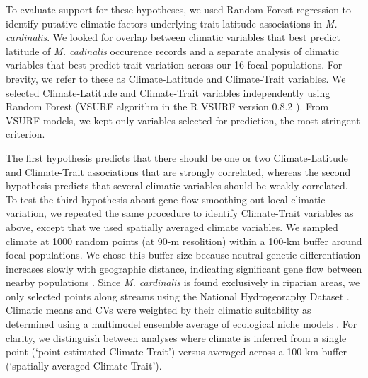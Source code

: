 \documentclass[11pt, oneside]{article}
\newcommand{\pkg}[1]{{\fontseries{b}\selectfont #1}}
\begin{document}
To evaluate support for these hypotheses, we used Random Forest regression \citep{Liaw_Wiener_2002} to identify putative climatic factors underlying trait-latitude associations in \textit{M. cardinalis}. We looked for overlap between climatic variables that best predict latitude of \textit{M. cadinalis} occurence records and a separate analysis of climatic variables that best predict trait variation across our 16 focal populations. For brevity, we refer to these as Climate-Latitude and Climate-Trait variables. We selected Climate-Latitude and Climate-Trait variables independently using Random Forest (VSURF algorithm in the R \pkg{VSURF} version 0.8.2 \citep{Genuer_etal_2014}). From VSURF models, we kept only variables selected for prediction, the most stringent criterion.

The first hypothesis predicts that there should be one or two Climate-Latitude and Climate-Trait associations that are strongly correlated, whereas the second hypothesis predicts that several climatic variables should be weakly correlated. To test the third hypothesis about gene flow smoothing out local climatic variation, we repeated the same procedure to identify Climate-Trait variables as above, except that we used spatially averaged climate variables. We sampled climate at 1000 random points (at 90-m resolition) within a 100-km buffer around focal populations. We chose this buffer size because neutral genetic differentiation increases slowly with geographic distance, indicating significant gene flow between nearby populations \citep{Paul_etal_2016}. Since \textit{M. cardinalis} is found exclusively in riparian areas, we only selected points along streams using the National Hydrogeoraphy Dataset \citep{NHD}. Climatic means and CVs were weighted by their climatic suitability as determined using a multimodel ensemble average of ecological niche models \citep{Angert_ENM}. For clarity, we distinguish between analyses where climate is inferred from a single point (`point estimated Climate-Trait') versus averaged across a 100-km buffer (`spatially averaged Climate-Trait'). 
\end{document}
